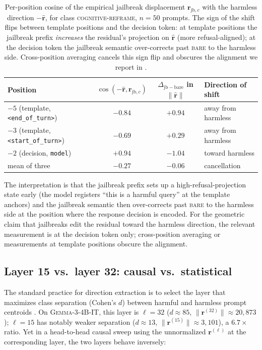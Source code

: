 \documentclass{article}
\newcommand{\rhat}{\hat{\bm{r}}}
\newcommand{\rvec}{\bm{r}}
\newcommand{\rjbc}{\bm{r}_{\mathrm{jb},c}}
\newcommand{\norm}[1]{\lVert #1 \rVert}
\newcommand{\gemma}{\textsc{Gemma-3-4B-IT}}
\begin{document}
\begin{table}[h]
\centering
\small
\begin{tabular}{lccl}
\toprule
Position & $\cos(-\rhat, \rjbc)$ & $\Delta_{\mathrm{jb-bare}}$ in $\norm{\rhat}$ & Direction of shift \\
\midrule
$-5$ (template, \texttt{<end\_of\_turn>})    & $-0.84$ & $+0.94$ & away from harmless \\
$-3$ (template, \texttt{<start\_of\_turn>})  & $-0.69$ & $+0.29$ & away from harmless \\
$-2$ (decision, \texttt{model})              & $\mathbf{+0.94}$ & $\mathbf{-1.04}$ & toward harmless \\
\midrule
mean of three                                & $-0.27$ & $-0.06$ & cancellation \\
\bottomrule
\end{tabular}
\caption{Per-position cosine of the empirical jailbreak displacement
$\rjbc$ with the harmless direction $-\rhat$, for class
\textsc{cognitive-reframe}, $n = 50$ prompts. The sign of the shift
flips between template positions and the decision token: at template
positions the jailbreak prefix \emph{increases} the residual's
projection on $\rhat$ (more refusal-aligned); at the decision token
the jailbreak semantic over-corrects past \textsc{bare} to the
harmless side. Cross-position averaging cancels this sign flip and
obscures the alignment we report in .}
\label{tab:per-position}
\end{table}

The interpretation is that the jailbreak prefix sets up a
high-refusal-projection state early (the model registers
``this is a harmful query'' at the template anchors) and the
jailbreak semantic then over-corrects past \textsc{bare} to the
harmless side at the position where the response decision is
encoded. For the geometric claim that jailbreaks edit the residual
toward the harmless direction, the relevant measurement is at the
decision token only; cross-position averaging or measurements at
template positions obscure the alignment.

\subsection{Layer 15 vs.\ layer 32: causal vs.\ statistical}
\label{app:layer-selection}

The standard practice for direction extraction is to select the
layer that maximizes class separation (Cohen's $d$) between harmful
and harmless prompt centroids
\citep{arditi2024refusal,panickssery2023steering}. On \gemma{},
this layer is $\ell = 32$ ($d \approx 85$,
$\norm{\rvec^{(32)}} \approx 20{,}873$); $\ell = 15$ has notably
weaker separation ($d \approx 13$,
$\norm{\rvec^{(15)}} \approx 3{,}101$), a $6.7\times$ ratio. Yet in
a head-to-head causal sweep using the unnormalized $\rvec^{(\ell)}$
at the corresponding layer, the two layers behave inversely:
\end{document}
